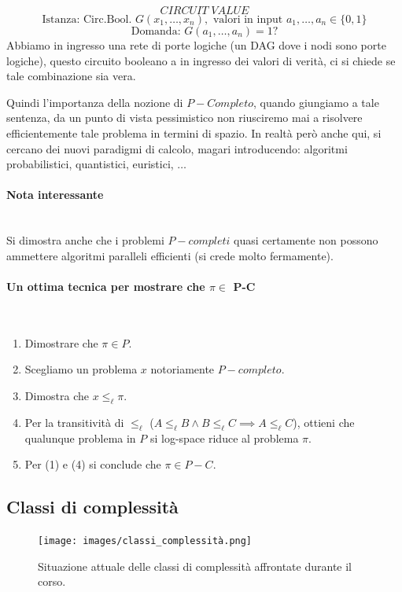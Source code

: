 \documentclass{article}
\begin{document}
$$CIRCUIT\;VALUE$$
$$\text{Istanza: Circ.Bool. }G(x_1,\dots,x_n),\text{ valori in input }a_1,\dots,a_n\in \{0,1\}$$
$$\text{Domanda: }G(a_1,\dots,a_n)=1?$$
Abbiamo in ingresso una rete di porte logiche (un DAG dove i nodi sono porte logiche), questo
circuito booleano a in ingresso dei valori di verità, ci si chiede se tale combinazione sia
vera.

Quindi l'importanza della nozione di $P-Completo$, quando giungiamo a tale sentenza, da un punto
di vista pessimistico non riusciremo mai a risolvere efficientemente tale problema in termini di spazio.
In realtà però anche qui, si cercano dei nuovi paradigmi di calcolo, magari introducendo:
algoritmi probabilistici, quantistici, euristici, $\dots$

\paragraph{Nota interessante}\mbox{}\\
Si dimostra anche che i problemi $P-completi$ quasi certamente non possono ammettere
algoritmi paralleli efficienti (si crede molto fermamente).


\paragraph{Un ottima tecnica per mostrare che $\pi\in$ P-C}\mbox{}\\
\begin{enumerate}
    \item Dimostrare che $\pi\in P$.
    \item Scegliamo un problema $x$ notoriamente $P-completo$.
    \item Dimostra che $x\leq_{\ell}\pi$.
    \item Per la transitività di $\leq_{\ell}$ ($A\leq_{\ell}B\land B\leq_{\ell} C\implies A\leq_{\ell}C$),
    ottieni che qualunque problema in $P$ si log-space riduce al problema $\pi$.
    \item Per (1) e (4) si conclude che $\pi\in P-C$.
\end{enumerate}

\subsection{Classi di complessità}
\begin{figure}[H]
    \centering
    \texttt{[image: images/classi\_complessità.png]}
    \caption{Situazione attuale delle classi di complessità affrontate durante il corso.}
\end{figure}
\end{document}
